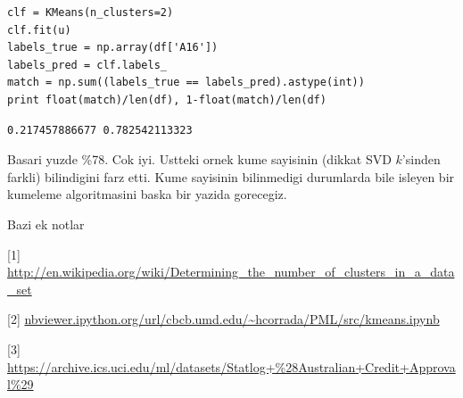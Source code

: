 \documentclass[12pt,fleqn]{article}\usepackage{../common}
\begin{document}
\begin{verbatim}
clf = KMeans(n_clusters=2)
clf.fit(u)
labels_true = np.array(df['A16'])
labels_pred = clf.labels_
match = np.sum((labels_true == labels_pred).astype(int))
print float(match)/len(df), 1-float(match)/len(df)
\end{verbatim}

\begin{verbatim}
0.217457886677 0.782542113323
\end{verbatim}

Basari yuzde \%78. Cok iyi. Ustteki ornek kume sayisinin (dikkat SVD
$k$'sinden farkli) bilindigini farz etti. Kume sayisinin bilinmedigi
durumlarda bile isleyen bir kumeleme algoritmasini baska bir yazida
gorecegiz. 

Bazi ek notlar

[1] \url{http://en.wikipedia.org/wiki/Determining_the_number_of_clusters_in_a_data_set}

[2] \url{nbviewer.ipython.org/url/cbcb.umd.edu/~hcorrada/PML/src/kmeans.ipynb}

[3] \url{https://archive.ics.uci.edu/ml/datasets/Statlog+%28Australian+Credit+Approval%29}
\end{document}
